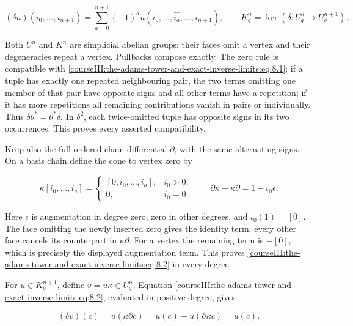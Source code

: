 \begin{equation}
(\delta u)(i_0,\ldots,i_{n+1})
   =\sum_{a=0}^{n+1}(-1)^a
          u(i_0,\ldots,\widehat{i_a},\ldots,i_{n+1}),
 \qquad K^n_q=\ker(\delta:U^n_q\to U^{n+1}_q).
 \label{courseIII:the-adams-tower-and-exact-inverse-limits:eq:8.1}
\end{equation}

Both \(U^n\) and \(K^n\) are simplicial abelian groups: their faces omit a vertex and their degeneracies repeat a vertex. Pullbacks compose exactly. The zero rule is compatible with \eqref{courseIII:the-adams-tower-and-exact-inverse-limits:eq:8.1}: if a tuple has exactly one repeated neighbouring pair, the two terms omitting one member of that pair have opposite signs and all other terms have a repetition; if it has more repetitions all remaining contributions vanish in pairs or individually. Thus \(\delta\theta^*=\theta^*\delta\). In \(\delta^2\), each twice-omitted tuple has opposite signs in its two occurrences. This proves every asserted compatibility.

Keep also the full ordered chain differential \(\partial\), with the same alternating signs. On a basis chain define the cone to vertex zero by

\begin{equation}
\kappa[i_0,\ldots,i_a]=
 \begin{cases}[0,i_0,\ldots,i_a],&i_0>0,\\0,&i_0=0.
 \end{cases}
 \qquad
 \partial\kappa+\kappa\partial=1-\iota_0\epsilon.
 \label{courseIII:the-adams-tower-and-exact-inverse-limits:eq:8.2}
\end{equation}

Here \(\epsilon\) is augmentation in degree zero, zero in other degrees, and \(\iota_0(1)=[0]\). The face omitting the newly inserted zero gives the identity term; every other face cancels its counterpart in \(\kappa\partial\). For a vertex the remaining term is \(-[0]\), which is precisely the displayed augmentation term. This proves \eqref{courseIII:the-adams-tower-and-exact-inverse-limits:eq:8.2} in every degree.

For \(u\in K^{n+1}_q\), define \(v=u\kappa\in U^n_q\). Equation \eqref{courseIII:the-adams-tower-and-exact-inverse-limits:eq:8.2}, evaluated in positive degree, gives

\begin{equation}
(\delta v)(c)=u(\kappa\partial c)
  =u(c)-u(\partial\kappa c)=u(c).
 \label{courseIII:the-adams-tower-and-exact-inverse-limits:eq:8.3}
\end{equation}

